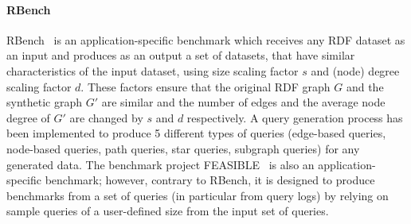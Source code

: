 \paragraph{RBench} RBench~\cite{Qiao:2015:RAR:2723372.2746479} is an application-specific benchmark which receives any RDF dataset as an input and produces as an output a set of datasets, that have similar characteristics of the input dataset, using size scaling factor $s$ and (node) degree scaling factor $d$. These factors ensure that the original RDF graph $G$ and the synthetic graph $G'$ are similar and the number of edges and the average node degree of $G'$ are changed by $s$ and $d$ respectively. \iffalse A generated benchmark dataset is considered similar to the given dataset if their values for the dataset evaluation metrics and query evaluation times for different techniques are similar. Three evaluation metrics are utilized for this purpose: dataset coherence (i.e., a measure how uniformly predicates are distributed among the same type/class), relationship specialty (i.e., the number of occurrences of the same predicate associated with each resource), and literal diversity.\fi A query generation process has been implemented to produce 5 different types of queries (edge-based queries, node-based queries, path queries, star queries, subgraph queries) for any generated data. The benchmark project FEASIBLE~\cite{Saleem2015} is also an application-specific benchmark; however, contrary to RBench, it is designed to produce benchmarks from a set of queries (in particular from query logs) by relying on sample queries of a user-defined
size from the input set of queries.


